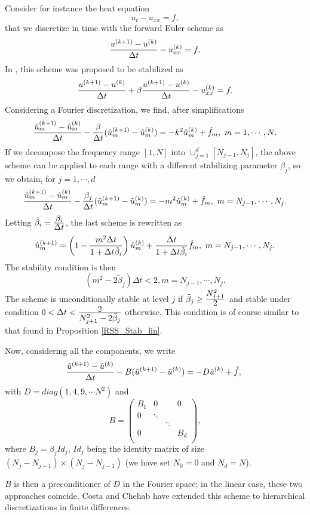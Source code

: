 {Consider for instance  the heat equation
$$
u_t-u_{xx}=f,
$$
that we discretize in time with the forward Euler scheme as
$$
\frac{\textstyle u^{(k+1)}-u^{(k)}} {\textstyle \Delta t} -u^{(k)}_{xx}=f.
$$
In \cite{BCostaPHD,CDGT},  this scheme was proposed to be stabilized as
$$
\frac{\textstyle u^{(k+1)}-u^{(k)}} {\textstyle \Delta t} +\beta
\frac{\textstyle u^{(k+1)}-u^{(k)}} {\textstyle \Delta t} -u^{(k)}_{xx}=f.
$$
Considering a Fourier discretization, we find, after simplifications
$$
\frac{\textstyle {\hat u}^{(k+1)}_m-{\hat u}_m^{(k)}} {\textstyle \Delta t} -\frac{\textstyle \beta} {\textstyle \Delta t}({\hat u}_m^{(k+1)}-{\hat u}_m^{(k)})
=-k^2{\hat u}^{(k)}_m + {\hat f}_m, \ m=1,\cdots, N.
$$
If we decompose the frequency range $[1,N]$ into $\displaystyle{\cup_{j=1}^{d}[N_{j-1},N_{j}]}$, the above scheme can be applied 
to each range with a different stabilizing parameter $\beta_j$, so we obtain, for $j=1,\cdots,d$
$$
\frac{\textstyle {\hat u}^{(k+1)}_m-{\hat u}^{(k)}_m} {\textstyle \Delta t} -\frac{\textstyle \beta_j} {\textstyle \Delta t}({\hat u}^{(k+1)}_m-{\hat u}^{(k)}_m)
=-m^2{\hat u}^{(k)}_m + {\hat f}_m, \ m=N_{j-1}, \cdots, N_{j}.
$$
Letting ${\tilde \beta}_i=\frac{\textstyle \beta_i} {\textstyle \Delta t}$, the last scheme is rewritten as
$$
{\hat u}^{(k+1)}_m=\left(1-\frac{\textstyle m^2\Delta t} {\textstyle 1+\Delta t {\tilde \beta_i}}\right){\hat u}^{(k)}_m
+\frac{\textstyle \Delta t} {\textstyle 1+\Delta t {\tilde \beta_i}}{\hat f}_m, \ m=N_{j-1}, \cdots, N_{j}.
$$
The stability condition is then
$$
(m^2-2{\tilde \beta}_j)\Delta t < 2, m=N_{j-1}, \cdots, N_{j}.
$$
The scheme is unconditionally stable at level $j$ if ${\tilde \beta}_j\ge \frac{\textstyle N^2_{j+1}} {\textstyle 2}$ and stable under condition $0<\Delta t <\frac{\textstyle 2} {\textstyle N^2_{j+1}-2{\tilde \beta}_j}$ otherwise. This condition is of course similar to that found in Proposition \ref{RSS_Stab_lin}.

Now, considering all the components, we write
$$
\frac{\textstyle {\hat u}^{(k+1)}-{\hat u}^{(k)}} {\textstyle \Delta t} -B({\hat u}^{(k+1)}-{\hat u}^{(k)})
=-D{\hat u}^{(k)} + {\hat f}, \
$$
with $D=diag(1,4,9, \cdots N^2)$ and 
$$
B=
\left(
\begin{array}{llll}
B_1 & 0 & & 0\\
0 & \ddots &  & \\
 & & \ddots &   \\
 0 & &  & B_d\\
\end{array}
\right),
$$
where $B_j=\beta_j Id_j$, $Id_j$ being the identity matrix of size $(N_{j}-N_{j-1}) \times (N_{j}- N_{j-1})$ (we have set $N_0=0$ and $N_d=N$).

$B$ is then a preconditioner of $D$ in the Fourier space; in the linear case, these two approaches coincide.
Costa and Chehab \cite{ChehabCosta1,ChehabCosta2} have
extended this scheme to hierarchical discretizations in finite
differences.

}
